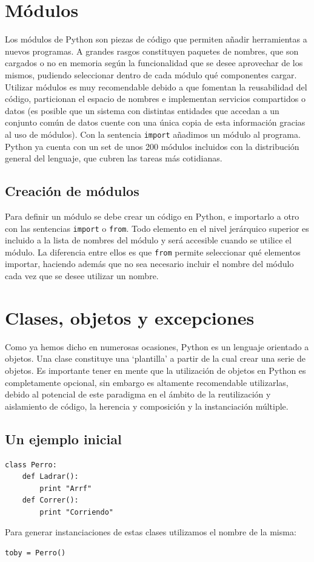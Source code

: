 \documentclass[12pt]{article} %
\begin{document}
\section{Módulos}
Los módulos de Python son piezas de código que permiten añadir herramientas a nuevos programas. A grandes rasgos constituyen paquetes de nombres, que son cargados o no en memoria según la funcionalidad que se desee aprovechar de los mismos, pudiendo seleccionar dentro de cada módulo qué componentes cargar.
Utilizar módulos es muy recomendable debido a que fomentan la reusabilidad del código, particionan el espacio de nombres e implementan servicios compartidos o datos (es posible que un sistema con distintas entidades que accedan a un conjunto común de datos cuente con una única copia de esta información gracias al uso de módulos).
Con la sentencia \verb+import+ añadimos un módulo al programa.
Python ya cuenta con un set de unos 200 módulos incluidos con la distribución general del lenguaje, que cubren las tareas más cotidianas.
\subsection{Creación de módulos}
Para definir un módulo se debe crear un código en Python, e importarlo a otro con las sentencias \verb+import+ o \verb+from+. Todo elemento en el nivel jerárquico superior es incluido a la lista de nombres del módulo y será accesible cuando se utilice el módulo. La diferencia entre ellos es que \verb+from+ permite seleccionar qué elementos importar, haciendo además que no sea necesario incluir el nombre del módulo cada vez que se desee utilizar un nombre.

\section{Clases, objetos y excepciones}
Como ya hemos dicho en numerosas ocasiones, Python es un lenguaje orientado a objetos. Una clase constituye una `plantilla' a partir de la cual crear una serie de objetos. Es importante tener en mente que la utilización de objetos en Python es completamente opcional, sin embargo es altamente recomendable utilizarlas, debido al potencial de este paradigma en el ámbito de la reutilización y aislamiento de código, la herencia y composición y la instanciación múltiple.
\subsection{Un ejemplo inicial}
\begin{lstlisting}[frame=single, showspaces=false]
class Perro:
	def Ladrar():
		print "Arrf"
	def Correr():
		print "Corriendo"
\end{lstlisting}
Para generar instanciaciones de estas clases utilizamos el nombre de la misma:
\begin{lstlisting}[frame=single, showspaces=false]
toby = Perro()
\end{lstlisting}
\end{document}
